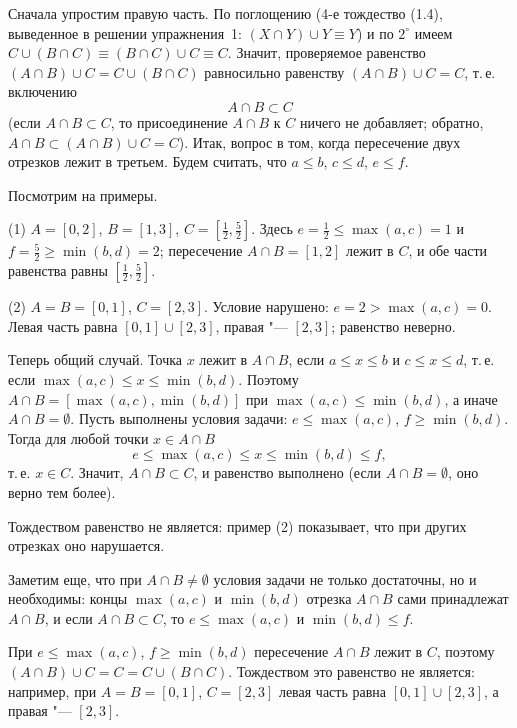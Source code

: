 \begin{solution}[3 (\S\,1)]
Сначала упростим правую часть. По поглощению (4-е тождество (1.4),
выведенное в решении упражнения~1: $(X\cap Y)\cup Y\equiv Y$) и по $2^\circ$
имеем $C\cup(B\cap C)\equiv(B\cap C)\cup C\equiv C$. Значит, проверяемое
равенство $(A\cap B)\cup C=C\cup(B\cap C)$ равносильно равенству
$(A\cap B)\cup C=C$, т.\,е. включению
\[
A\cap B\subset C
\]
(если $A\cap B\subset C$, то присоединение $A\cap B$ к $C$ ничего не
добавляет; обратно, $A\cap B\subset(A\cap B)\cup C=C$). Итак, вопрос
в том, когда пересечение двух отрезков лежит в третьем. Будем считать,
что $a\le b$, $c\le d$, $e\le f$.

Посмотрим на примеры.

(1) $A=[0,2]$, $B=[1,3]$, $C=[\frac12,\frac52]$. Здесь
$e=\frac12\le\max(a,c)=1$ и $f=\frac52\ge\min(b,d)=2$; пересечение
$A\cap B=[1,2]$ лежит в $C$, и обе части равенства равны $[\frac12,\frac52]$.

(2) $A=B=[0,1]$, $C=[2,3]$. Условие нарушено: $e=2>\max(a,c)=0$. Левая
часть равна $[0,1]\cup[2,3]$, правая "--- $[2,3]$; равенство неверно.

Теперь общий случай. Точка $x$ лежит в $A\cap B$, если $a\le x\le b$
и $c\le x\le d$, т.\,е. если $\max(a,c)\le x\le\min(b,d)$. Поэтому
$A\cap B=[\max(a,c),\min(b,d)]$ при $\max(a,c)\le\min(b,d)$, а иначе
$A\cap B=\emptyset$. Пусть выполнены условия задачи: $e\le\max(a,c)$,
$f\ge\min(b,d)$. Тогда для любой точки $x\in A\cap B$
\[
e\le\max(a,c)\le x\le\min(b,d)\le f,
\]
т.\,е. $x\in C$. Значит, $A\cap B\subset C$, и равенство выполнено (если
$A\cap B=\emptyset$, оно верно тем более).

Тождеством равенство не является: пример (2) показывает, что при других
отрезках оно нарушается.

Заметим еще, что при $A\cap B\ne\emptyset$ условия задачи не только
достаточны, но и необходимы: концы $\max(a,c)$ и $\min(b,d)$ отрезка
$A\cap B$ сами принадлежат $A\cap B$, и если $A\cap B\subset C$, то
$e\le\max(a,c)$ и $\min(b,d)\le f$.

\answer При $e\le\max(a,c)$, $f\ge\min(b,d)$ пересечение $A\cap B$ лежит
в $C$, поэтому $(A\cap B)\cup C=C=C\cup(B\cap C)$. Тождеством это
равенство не является: например, при $A=B=[0,1]$, $C=[2,3]$ левая часть
равна $[0,1]\cup[2,3]$, а правая "--- $[2,3]$.
\end{solution}

